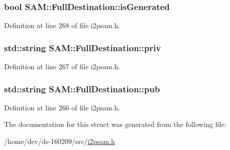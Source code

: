 \subsubsection[{is\+Generated}]{\setlength{\rightskip}{0pt plus 5cm}bool S\+A\+M\+::\+Full\+Destination\+::is\+Generated}\label{struct_s_a_m_1_1_full_destination_a1331a1c5cc053781fa127c0c23bb7b9b}


Definition at line 268 of file i2psam.\+h.

\hypertarget{struct_s_a_m_1_1_full_destination_a9ce0281e2f9cd55dcfc773c7fbd09f0f}{}
\subsubsection[{priv}]{\setlength{\rightskip}{0pt plus 5cm}std\+::string S\+A\+M\+::\+Full\+Destination\+::priv}\label{struct_s_a_m_1_1_full_destination_a9ce0281e2f9cd55dcfc773c7fbd09f0f}


Definition at line 267 of file i2psam.\+h.

\hypertarget{struct_s_a_m_1_1_full_destination_abd0be9a7b3b430ca750f1e876f2d6b4b}{}
\subsubsection[{pub}]{\setlength{\rightskip}{0pt plus 5cm}std\+::string S\+A\+M\+::\+Full\+Destination\+::pub}\label{struct_s_a_m_1_1_full_destination_abd0be9a7b3b430ca750f1e876f2d6b4b}


Definition at line 266 of file i2psam.\+h.



The documentation for this struct was generated from the following file\+:\begin{DoxyCompactItemize}
\item 
/home/dev/ds-\/160209/src/\hyperlink{i2psam_8h}{i2psam.\+h}\end{DoxyCompactItemize}
